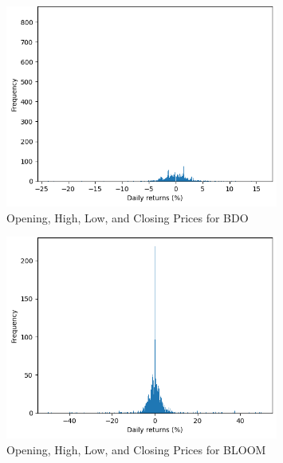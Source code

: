 \begin{figure}[ht]
    \centering
    \includegraphics[width=0.80\textwidth]{./assets/Appendices/B/Distribution_DailyReturns/BDO.png}
    \caption{Opening, High, Low, and Closing Prices for BDO}
    \label{fig:returndist_BDO}
\end{figure}
\FloatBarrier

\begin{figure}[ht]
    \centering
    \includegraphics[width=0.80\textwidth]{./assets/Appendices/B/Distribution_DailyReturns/BLOOM.png}
    \caption{Opening, High, Low, and Closing Prices for BLOOM}
    \label{fig:returndist_BLOOM}
\end{figure}
\FloatBarrier

